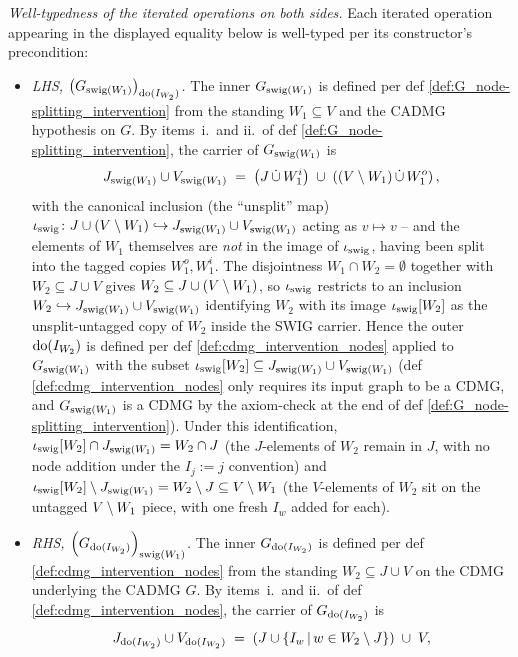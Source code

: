 \documentclass[main]{subfiles}
\begin{document}
\begin{Lem}
    \emph{Well-typedness of the iterated operations on both sides.}
    Each iterated operation appearing in the displayed equality below is well-typed per its constructor's precondition:
    \begin{itemize}
        \item \emph{LHS, $\left ( G_{\mathrm{swig}(W_1)} \right )_{\operatorname{do}(I_{W_2})}$.} The inner $G_{\mathrm{swig}(W_1)}$ is defined per def \ref{def:G_node-splitting_intervention} from the standing $W_1 \subseteq V$ and the CADMG hypothesis on $G$. By items~i.\ and ii.\ of def \ref{def:G_node-splitting_intervention}, the carrier of $G_{\mathrm{swig}(W_1)}$ is
              \[ J_{\mathrm{swig}(W_1)} \cup V_{\mathrm{swig}(W_1)} \;=\; \left ( J \,\dot{\cup}\, W_1^i \right ) \;\cup\; \left ( (V \setminus W_1) \,\dot{\cup}\, W_1^o \right ), \]
              with the canonical inclusion (the ``unsplit'' map) $\iota_{\mathrm{swig}} \colon J \cup (V \setminus W_1) \hookrightarrow J_{\mathrm{swig}(W_1)} \cup V_{\mathrm{swig}(W_1)}$ acting as $v \mapsto v$ -- and the elements of $W_1$ themselves are \emph{not} in the image of $\iota_{\mathrm{swig}}$, having been split into the tagged copies $W_1^o, W_1^i$. The disjointness $W_1 \cap W_2 = \emptyset$ together with $W_2 \subseteq J \cup V$ gives $W_2 \subseteq J \cup (V \setminus W_1)$, so $\iota_{\mathrm{swig}}$ restricts to an inclusion $W_2 \hookrightarrow J_{\mathrm{swig}(W_1)} \cup V_{\mathrm{swig}(W_1)}$ identifying $W_2$ with its image $\iota_{\mathrm{swig}}[W_2]$ as the unsplit-untagged copy of $W_2$ inside the SWIG carrier. Hence the outer $\operatorname{do}(I_{W_2})$ is defined per def \ref{def:cdmg_intervention_nodes} applied to $G_{\mathrm{swig}(W_1)}$ with the subset $\iota_{\mathrm{swig}}[W_2] \subseteq J_{\mathrm{swig}(W_1)} \cup V_{\mathrm{swig}(W_1)}$ (def \ref{def:cdmg_intervention_nodes} only requires its input graph to be a CDMG, and $G_{\mathrm{swig}(W_1)}$ is a CDMG by the axiom-check at the end of def \ref{def:G_node-splitting_intervention}). Under this identification, $\iota_{\mathrm{swig}}[W_2] \cap J_{\mathrm{swig}(W_1)} = W_2 \cap J$ (the $J$-elements of $W_2$ remain in $J$, with no node addition under the $I_j := j$ convention) and $\iota_{\mathrm{swig}}[W_2] \setminus J_{\mathrm{swig}(W_1)} = W_2 \setminus J \subseteq V \setminus W_1$ (the $V$-elements of $W_2$ sit on the untagged $V \setminus W_1$ piece, with one fresh $I_w$ added for each).
        \item \emph{RHS, $\left ( G_{\operatorname{do}(I_{W_2})} \right )_{\mathrm{swig}(W_1)}$.} The inner $G_{\operatorname{do}(I_{W_2})}$ is defined per def \ref{def:cdmg_intervention_nodes} from the standing $W_2 \subseteq J \cup V$ on the CDMG underlying the CADMG $G$. By items~i.\ and ii.\ of def \ref{def:cdmg_intervention_nodes}, the carrier of $G_{\operatorname{do}(I_{W_2})}$ is
              \[ J_{\operatorname{do}(I_{W_2})} \cup V_{\operatorname{do}(I_{W_2})} \;=\; \left ( J \cup \left \{ I_w \,\middle|\, w \in W_2 \setminus J \right \} \right ) \;\cup\; V, \]

\end{itemize}
\end{Lem}
\end{document}
